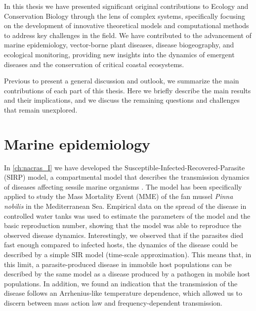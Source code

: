
In this thesis we have presented significant original contributions to Ecology
and Conservation Biology through the lens of complex systems, specifically
focusing on the development of innovative theoretical models and computational
methods to address key challenges in the field. We have contributed to the
advancement of marine epidemiology, vector-borne plant diseases, disease
biogeography, and ecological monitoring, providing new insights into the
dynamics of emergent diseases and the conservation of critical coastal
ecosystems.

Previous to present a general discussion and outlook, we summarize the main
contributions of each part of this thesis. Here we briefly describe the main
results and their implications, and we discuss the remaining questions and
challenges that remain unexplored.

\section{Marine epidemiology}

In \cref{ch:nacras_I} we have developed the
Susceptible-Infected-Recovered-Parasite (SIRP) model, a compartmental model
that describes the transmission dynamics of diseases affecting sessile marine
organisms \cite{GimenezRomero2021}. The model has been specifically applied to
study the Mass Mortality Event (MME) of the fan mussel \textit{Pinna nobilis}
in the Mediterranean Sea. Empirical data on the spread of the disease in
controlled water tanks was used to estimate the parameters of the model and the
basic reproduction number, showing that the model was able to reproduce the
observed disease dynamics. Interestingly, we observed that if the parasites
died fast enough compared to infected hosts, the dynamics of the disease could
be described by a simple SIR model (time-scale approximation). This means that,
in this limit, a parasite-produced disease in immobile host populations can be
described by the same model as a disease produced by a pathogen in mobile host
populations. In addition, we found an indication that the transmission of the
disease follows an Arrhenius-like temperature dependence, which allowed us to
discern between mass action law and frequency-dependent transmission.


